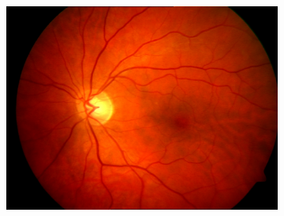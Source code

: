 \begin{figure}[H]
    \centering
    \begin{subfigure}[b]{0.1\textwidth}
				\centering
        \includegraphics[height=2\textwidth]{./Figures/imagesARIA.png}\hspace{10mm}

\end{subfigure}
\end{figure}
